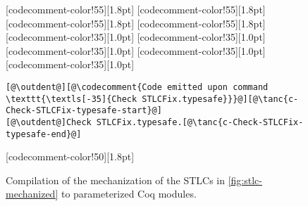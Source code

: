 \begin{figure}
\begin{minipage}{\textwidth}
\begin{multicols}{2}
[codecomment-color!55][1.8pt]
[codecomment-color!55][1.8pt]
[codecomment-color!55][1.8pt]
[codecomment-color!55][1.8pt]
[codecomment-color!35][1.0pt]
[codecomment-color!35][1.0pt]
[codecomment-color!35][1.0pt]
[codecomment-color!35][1.0pt]
[codecomment-color!35][1.0pt]

\vspace{-12pt}


\begin{lstlisting}
[@\outdent@][@\codecomment{Code emitted upon command \texttt{\textls[-35]{Check STLCFix.typesafe}}}@][@\tanc{c-Check-STLCFix-typesafe-start}@]
[@\outdent@]Check STLCFix.typesafe.[@\tanc{c-Check-STLCFix-typesafe-end}@]
\end{lstlisting}

[codecomment-color!50][1.8pt]

\end{multicols}
\end{minipage}


\caption{Compilation of the mechanization of the STLCs in \cref{fig:stlc-mechanized} to parameterized Coq modules.}
\label{fig:stlc-compiled}
\end{figure}